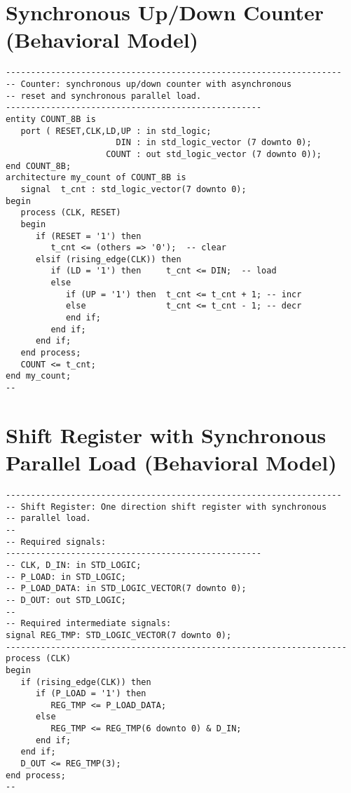 \section{Synchronous Up/Down Counter (Behavioral Model)}
\noindent
\begin{minipage}{1\linewidth}
\begin{lstlisting}
-------------------------------------------------------------------
-- Counter: synchronous up/down counter with asynchronous 
-- reset and synchronous parallel load. 
---------------------------------------------------
entity COUNT_8B is
   port ( RESET,CLK,LD,UP : in std_logic; 
                      DIN : in std_logic_vector (7 downto 0); 
                    COUNT : out std_logic_vector (7 downto 0)); 
end COUNT_8B; 
architecture my_count of COUNT_8B is 
   signal  t_cnt : std_logic_vector(7 downto 0); 
begin          
   process (CLK, RESET) 
   begin
      if (RESET = '1') then    
         t_cnt <= (others => '0');  -- clear
      elsif (rising_edge(CLK)) then
         if (LD = '1') then     t_cnt <= DIN;  -- load
         else 
            if (UP = '1') then  t_cnt <= t_cnt + 1; -- incr
            else                t_cnt <= t_cnt - 1; -- decr
            end if;
         end if;
      end if;
   end process;
   COUNT <= t_cnt; 
end my_count;
--
\end{lstlisting}
\end{minipage}

\section{Shift Register with Synchronous Parallel Load (Behavioral Model)}
\noindent
\begin{minipage}{1\linewidth}
\begin{lstlisting}
-------------------------------------------------------------------
-- Shift Register: One direction shift register with synchronous 
-- parallel load. 
-- 
-- Required signals: 
---------------------------------------------------
-- CLK, D_IN: in STD_LOGIC;
-- P_LOAD: in STD_LOGIC;
-- P_LOAD_DATA: in STD_LOGIC_VECTOR(7 downto 0);
-- D_OUT: out STD_LOGIC; 
-- 
-- Required intermediate signals: 
signal REG_TMP: STD_LOGIC_VECTOR(7 downto 0);
-------------------------------------------------------------------- 
process (CLK)
begin
   if (rising_edge(CLK)) then
      if (P_LOAD = '1') then
         REG_TMP <= P_LOAD_DATA;
      else
         REG_TMP <= REG_TMP(6 downto 0) & D_IN;
      end if;
   end if;
   D_OUT <= REG_TMP(3);
end process;
--
\end{lstlisting}
\end{minipage}

